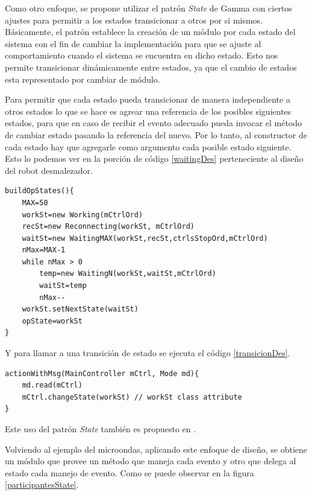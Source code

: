 Como otro enfoque, se propone utilizar el patrón \textit{State} de Gamma con ciertos ajustes para permitir a los estados transicionar a otros por si mismos. Básicamente, el patrón establece la creación de un módulo por cada estado del sistema con el fin de cambiar la implementación para que se ajuste al comportamiento cuando el sistema se encuentra en dicho estado. Esto nos permite transicionar dinámicamente entre estados, ya que el cambio de estados esta representado por cambiar de módulo.

Para permitir que cada estado pueda transicionar de manera independiente a otros estados lo que se hace es agrear una referencia de los posibles siguientes estados, para que en caso de recibir el evento adecuado pueda invocar el método de cambiar estado pasando la referencia del nuevo. Por lo tanto, al constructor de cada estado hay que agregarle como argumento cada posible estado siguiente. Esto lo podemos ver en la porción de código \ref{waitingDes} perteneciente al diseño del robot desmalezador.

\begin{lstlisting}[label={waitingDes},caption=Código ejemplo transición robot desmalezador,style=seudocode]
buildOpStates(){
    MAX=50
    workSt=new Working(mCtrlOrd)
    recSt=new Reconnecting(workSt, mCtrlOrd)
    waitSt=new WaitingMAX(workSt,recSt,ctrlsStopOrd,mCtrlOrd)
    nMax=MAX-1
    while nMax > 0
        temp=new WaitingN(workSt,waitSt,mCtrlOrd)
        waitSt=temp
        nMax--
    workSt.setNextState(waitSt)
    opState=workSt
}
\end{lstlisting}

Y para llamar a una transición de estado se ejecuta el código \ref{transicionDes}.
\begin{lstlisting}[label={transicionDes}, caption=Ejemplo transición de estado.,style=seudocode]
actionWithMsg(MainController mCtrl, Mode md){
    md.read(mCtrl)
    mCtrl.changeState(workSt) // workSt class attribute
}
\end{lstlisting}

Este uso del patrón \textit{State} también es propuesto en \cite[\textit{Chapter 10 : Finite State Machine Patterns Part III: New Patterns as Design Components}]{douglass}.


Volviendo al ejemplo del microondas, aplicando este enfoque de diseño, se obtiene un módulo que provee un método que maneja cada evento y otro que delega al estado cada manejo de evento. Como se puede observar en la figura \ref{participantesState}.

